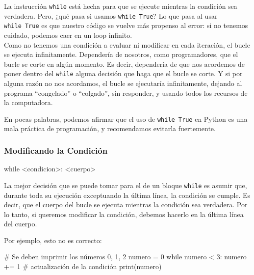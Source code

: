 \documentclass[
  letterpaper,
  DIV=11,
  numbers=noendperiod]{scrreprt}
\newenvironment{Shaded}{\begin{snugshade}}{\end{snugshade}}
\newcommand{\BuiltInTok}[1]{\textcolor[rgb]{0.00,0.23,0.31}{#1}}
\newcommand{\CommentTok}[1]{\textcolor[rgb]{0.37,0.37,0.37}{#1}}
\newcommand{\ControlFlowTok}[1]{\textcolor[rgb]{0.00,0.23,0.31}{#1}}
\newcommand{\DecValTok}[1]{\textcolor[rgb]{0.68,0.00,0.00}{#1}}
\newcommand{\NormalTok}[1]{\textcolor[rgb]{0.00,0.23,0.31}{#1}}
\newcommand{\OperatorTok}[1]{\textcolor[rgb]{0.37,0.37,0.37}{#1}}
\begin{document}
La instrucción \texttt{while} está hecha para que se ejecute mientras la
condición sea verdadera. Pero, ¿qué pasa si usamos \texttt{while\ True}?
Lo que pasa al usar \texttt{while\ True} es que nuestro código se vuelve
más propenso al error: si no tenemos cuidado, podemos caer en un loop
infinito.\\

Como no tenemos una condición a evaluar ni modificar en cada iteración,
el bucle se ejecuta infinitamente. Dependería de nosotros, como
programadores, que el bucle se corte en algún momento. Es decir,
dependería de que nos acordemos de poner dentro del \texttt{while}
alguna decisión que haga que el bucle se corte. Y si por alguna razón no
nos acordamos, el bucle se ejecutaría infinitamente, dejando al programa
``congelado'' o ``colgado'', sin responder, y usando todos los recursos
de la computadora.

En pocas palabras, podemos afirmar que el uso de \texttt{while\ True} en
Python es una mala práctica de programación, y recomendamos evitarla
fuertemente.

\hypertarget{modificando-la-condiciuxf3n}{%
\subsubsection{Modificando la
Condición}\label{modificando-la-condiciuxf3n}}

\begin{Shaded}
\begin{Highlighting}[]
\ControlFlowTok{while} \OperatorTok{\textless{}}\NormalTok{condicion}\OperatorTok{\textgreater{}}\NormalTok{:}
  \OperatorTok{\textless{}}\NormalTok{cuerpo}\OperatorTok{\textgreater{}}
\end{Highlighting}
\end{Shaded}

La mejor decisión que se puede tomar para el de un bloque \texttt{while}
es asumir que, durante toda su ejecución exceptuando la última línea, la
condición se cumple. Es decir, que el cuerpo del bucle se ejecuta
mientras la condición sea verdadera. Por lo tanto, si queremos modificar
la condición, debemos hacerlo en la última línea del cuerpo.

Por ejemplo, esto no es correcto:

\begin{Shaded}
\begin{Highlighting}[]
\CommentTok{\# Se deben imprimir los números 0, 1, 2}
\NormalTok{numero }\OperatorTok{=} \DecValTok{0}
\ControlFlowTok{while}\NormalTok{ numero }\OperatorTok{\textless{}} \DecValTok{3}\NormalTok{:}
\NormalTok{  numero }\OperatorTok{+=} \DecValTok{1}     \CommentTok{\# actualización de la condición}
  \BuiltInTok{print}\NormalTok{(numero)}
\end{Highlighting}
\end{Shaded}
\end{document}
